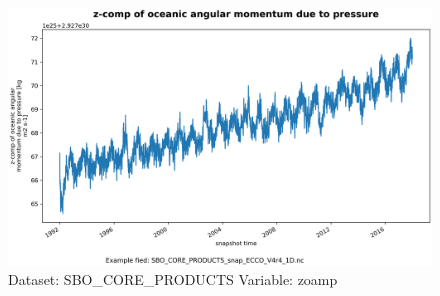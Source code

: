 \begin{figure}[H]
\centering
\includegraphics[scale=0.55]{../images/plots/oneD_plots/SBO_Core_Products/zoamp.png}
\caption{Dataset: SBO\_CORE\_PRODUCTS Variable: zoamp}
\label{tab:table-SBO_CORE_PRODUCTS_zoamp-Plot}
\end{figure}
\pagebreak

